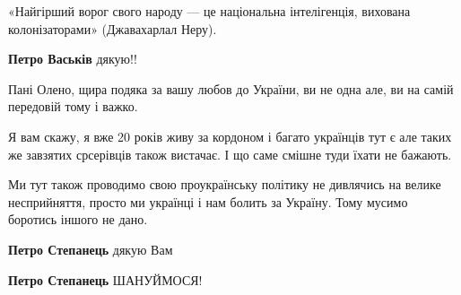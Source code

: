 \begin{itemize}
«Найгірший ворог свого народу — це національна інтелігенція, вихована
колонізаторами» (Джавахарлал Неру).

\begin{itemize}
 
\textbf{Петро Васьків} дякую!!
\end{itemize}

 

Пані Олено, щира подяка за вашу любов до України, ви не одна але, ви на самій
передовій тому і важко.

Я вам скажу, я вже 20 років живу за кордоном і багато українців тут є але таких
же завзятих срсерівців також вистачає. І що саме смішне туди їхати не бажають.

Ми тут також проводимо свою проукраїнську політику не дивлячись на велике
несприйняття, просто ми українці і нам болить за Україну. Тому мусимо боротись
іншого не дано.

\begin{itemize}
 
\textbf{Петро Степанець} дякую Вам

 
\textbf{Петро Степанець} ШАНУЙМОСЯ!
\end{itemize}

 


\end{itemize}
